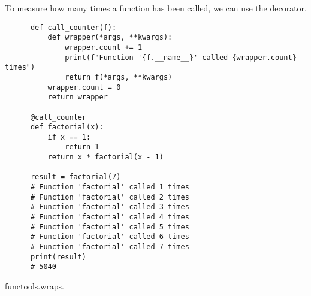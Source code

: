   \begin{example}
    To measure how many times a function has been called, we can use the decorator. 
    \begin{lstlisting}
      def call_counter(f):
          def wrapper(*args, **kwargs):
              wrapper.count += 1
              print(f"Function '{f.__name__}' called {wrapper.count} times")
              return f(*args, **kwargs)
          wrapper.count = 0
          return wrapper

      @call_counter
      def factorial(x): 
          if x == 1: 
              return 1 
          return x * factorial(x - 1)

      result = factorial(7)
      # Function 'factorial' called 1 times
      # Function 'factorial' called 2 times
      # Function 'factorial' called 3 times
      # Function 'factorial' called 4 times
      # Function 'factorial' called 5 times
      # Function 'factorial' called 6 times
      # Function 'factorial' called 7 times
      print(result)       
      # 5040
    \end{lstlisting}
  \end{example}

  functools.wraps. 

